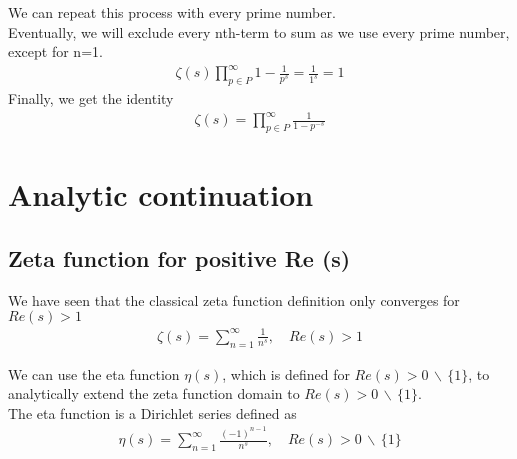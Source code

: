 \documentclass[a4paper]{article}
\newcommand{\exceptone}{
    \,\backslash\,\{1\}
}
\begin{document}
We can repeat this process with every prime number.
\\
Eventually, we will exclude every nth-term to sum as we use every prime number, except for n=1.
\begin{align*}
    \zeta(s)\prod_{p\in P}^{\infty}1-\frac{1}{p^s}=\frac{1}{1^s}=1
\end{align*}
Finally, we get the identity
\begin{align*}
    \zeta(s)=
    \prod_{p\in P}^{\infty}\frac{1}{1-p^{-s}}
\end{align*}

\pagebreak

\section{Analytic continuation}

\subsection{Zeta function for positive Re (s)}

We have seen that the classical zeta function definition only converges for \(Re(s)>1\)
\begin{align*}
    \zeta(s)=\sum_{n=1}^{\infty}\frac{1}{n^s},
    \quad Re(s)>1
\end{align*}

We can use the eta function \(\eta(s)\), which is defined for \(Re(s)>0\exceptone\), to analytically extend the zeta function domain to \(Re(s)>0\exceptone\).
\\
The eta function is a Dirichlet series defined as
\begin{align*}
    \eta(s)=\sum_{n=1}^{\infty}\frac{{(-1)}^{n-1}}{n^s},
    \quad Re(s)>0\exceptone
\end{align*}
\end{document}
